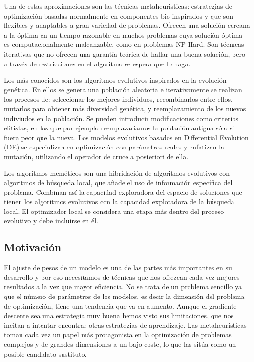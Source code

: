 Una de estas aproximaciones son las técnicas metaheuristicas: estrategias de optimización basadas normalmente en componentes bio-inspirados y que son flexibles y adaptables a gran variedad de problemas. Ofrecen una solución cercana a la óptima en un tiempo razonable en muchos problemas cuya solución óptima es computacionalmente inalcanzable, como en problemas NP-Hard. Son técnicas iterativas que no ofrecen una garantía teórica de hallar una buena solución, pero a través de restricciones en el algoritmo se espera que lo haga.

Los más conocidos son los algoritmos evolutivos inspirados en la evolución genética. En ellos se genera una población aleatoria e iterativamente se realizan los procesos de: seleccionar los mejores individuos, recombinarlos entre ellos, mutarlos para obtener más diversidad genética, y reemplazamiento de los nuevos indiviudos en la población. Se pueden introducir modificaciones como criterios elitistas, en los que por ejemplo reemplazaríamos la población antigua sólo si fuera peor que la nueva. Los modelos evolutivos basados en Differential Evolution (DE) se especializan en optimización con parámetros reales y enfatizan la mutación, utilizando el operador de cruce a posteriori de ella.

Los algoritmos meméticos son una hibridación de algoritmos evolutivos con algoritmos de búsqueda local, que añade el uso de información específica del problema. Combinan así la capacidad exploradora del espacio de soluciones que tienen los algoritmos evolutivos con la capacidad explotadora de la búsqueda local. El optimizador local se considera una etapa más dentro del proceso evolutivo y debe incluirse en él.



\subsection{Motivación}

El ajuste de pesos de un modelo es una de las partes más importantes en su desarrollo y por eso necesitamos de técnicas que nos ofrezcan cada vez mejores resultados a la vez que mayor eficiencia. No se trata de un problema sencillo ya que el número de parámetros de los modelos, es decir la dimensión del problema de optimización, tiene una tendencia que va en aumento. Aunque el gradiente descente sea una estrategia muy buena hemos visto sus limitaciones, que nos incitan a intentar encontrar otras estrategias de aprendizaje. Las metaheurísticas toman cada vez un papel más protagonista en la optimización de problemas complejos y de grandes dimensiones a un bajo coste, lo que las sitúa como un posible candidato sustituto.

